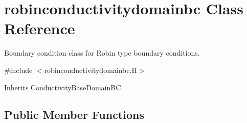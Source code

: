 \hypertarget{classrobinconductivitydomainbc}{}\section{robinconductivitydomainbc Class Reference}
\label{classrobinconductivitydomainbc}


Boundary condition class for Robin type boundary conditions.  




{\ttfamily \#include $<$robinconductivitydomainbc.\+H$>$}



Inherits Conductivity\+Base\+Domain\+BC.

\subsection*{Public Member Functions}
